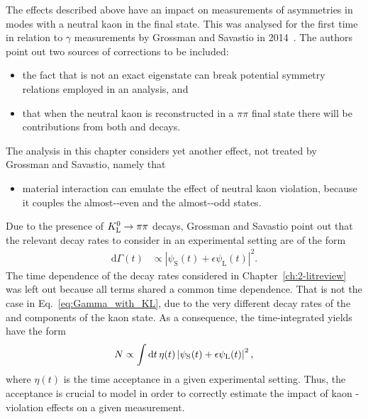 The effects described above have an impact on measurements of \CP asymmetries in modes with a neutral kaon in the final state. This was analysed for the first time in relation to $\gamma$ measurements by Grossman and Savastio in 2014~\cite{grossmanEffectsBarMixing2014}. The authors point out two sources of corrections to be included:
\begin{itemize}
    \item the fact that \KS is not an exact \CP eigenstate can break potential symmetry relations employed in an analysis, and
    \item that when the neutral kaon is reconstructed in a $\pi\pi$ final state there will be contributions from both \KS and \KL decays.
\end{itemize}
The analysis in this chapter considers yet another effect, not treated by Grossman and Savastio, namely that
\begin{itemize}
  \item material interaction can emulate the effect of neutral kaon \CP violation, because it couples the almost-\CP-even \KS and the almost-\CP-odd \KL states.  
\end{itemize}
Due to the presence of ${{K}^0_{\mathrm{L}}}\rightarrow\pi\pi$ decays, Grossman and Savastio point out that the relevant decay rates to consider in an experimental setting are of the form
\begin{align}\label{eq:Gamma_with_KL}
    \text{d} \Gamma(t) &\propto \left|\psi_\text{S}(t) + \epsilon \psi_\text{L}(t)\right|^2.
\end{align}
The time dependence of the decay rates considered in Chapter~\ref{ch:2-litreview} was left out because all terms shared a common time dependence. That is not the case in Eq.~\eqref{eq:Gamma_with_KL}, due to the very different decay rates of the \KS and \KL components of the kaon state. As a consequence, the time-integrated yields have the form
\begin{align}
  N \propto  \int \text d t \,\eta(t)\left|\psi_\text{S}(t) + \epsilon \psi_\text{L}(t)\right|^2,
\end{align}
where $\eta(t)$ is the time acceptance in a given experimental setting. Thus, the acceptance is crucial to model in order to correctly estimate the impact of kaon \CP-violation effects on a given measurement.

